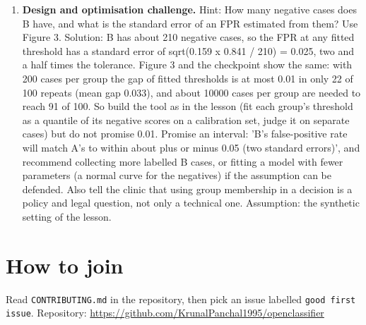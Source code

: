 \documentclass[11pt,a4paper]{article}
\begin{document}
\begin{enumerate}[nosep]
\item \textbf{Design and optimisation challenge.} Hint: How many negative cases does B have, and what is the standard error of an FPR estimated from them? Use Figure 3. Solution: B has about 210 negative cases, so the FPR at any fitted threshold has a standard error of sqrt(0.159 x 0.841 / 210) = 0.025, two and a half times the tolerance. Figure 3 and the checkpoint show the same: with 200 cases per group the gap of fitted thresholds is at most 0.01 in only 22 of 100 repeats (mean gap 0.033), and about 10000 cases per group are needed to reach 91 of 100. So build the tool as in the lesson (fit each group's threshold as a quantile of its negative scores on a calibration set, judge it on separate cases) but do not promise 0.01. Promise an interval: 'B's false-positive rate will match A's to within about plus or minus 0.05 (two standard errors)', and recommend collecting more labelled B cases, or fitting a model with fewer parameters (a normal curve for the negatives) if the assumption can be defended. Also tell the clinic that using group membership in a decision is a policy and legal question, not only a technical one. Assumption: the synthetic setting of the lesson.
\end{enumerate}

\section{How to join}
Read \texttt{CONTRIBUTING.md} in the repository, then pick an issue labelled \texttt{good first issue}. Repository: \url{https://github.com/KrunalPanchal1995/openclassifier}
\end{document}
